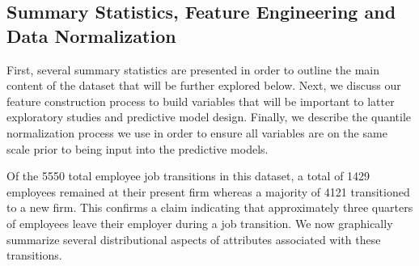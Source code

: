\documentclass[10pt]{article}
\begin{document}
\subsection{Summary Statistics, Feature Engineering and Data Normalization}

First, several summary statistics are presented in order to outline 
the main content of the dataset that will be further explored below.
Next, we discuss our feature construction process to build variables 
that will be important to latter exploratory studies and predictive 
model design.  Finally, we describe the quantile normalization process 
we use in order to ensure all variables are on the same scale prior 
to being input into the predictive models.

Of the 5550 total employee job transitions in this dataset, 
a total of 1429 employees remained at their present firm whereas a majority of 4121 
transitioned to a new firm.  This confirms a claim \cite{Smart2016} indicating 
that approximately three quarters of employees leave their employer during a job 
transition.  We now graphically summarize several distributional aspects of 
attributes associated with these transitions.
\end{document}
